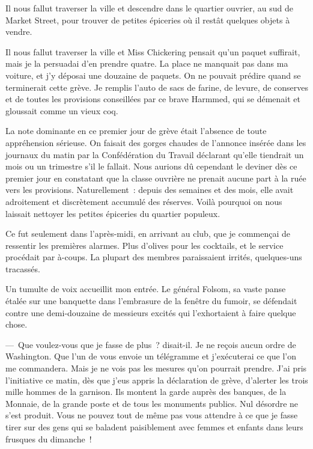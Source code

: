 \documentclass[french,twoside]{book} %
\begin{document}
Il nous fallut traverser la ville et descendre dans le quartier ouvrier, au sud de Market Street, pour trouver de petites épiceries où il restât quelques objets à vendre.\par
Il nous fallut traverser la ville et Miss Chickering pensait qu’un paquet suffirait, mais je la persuadai d’en prendre quatre. La place ne manquait pas dans ma voiture, et j’y déposai une douzaine de paquets. On ne pouvait prédire quand se terminerait cette grève. Je remplis l’auto de sacs de farine, de levure, de conserves et de toutes les provisions conseillées par ce brave Harmmed, qui se démenait et gloussait comme un vieux coq.\par
La note dominante en ce premier jour de grève était l’absence de toute appréhension sérieuse. On faisait des gorges chaudes de l’annonce insérée dans les journaux du matin par la Confédération du Travail déclarant qu’elle tiendrait un mois ou un trimestre s’il le fallait. Nous aurions dû cependant le deviner dès ce premier jour en constatant que la classe ouvrière ne prenait aucune part à la ruée vers les provisions. Naturellement : depuis des semaines et des mois, elle avait adroitement et discrètement accumulé des réserves. Voilà pourquoi on nous laissait nettoyer les petites épiceries du quartier populeux.\par
Ce fut seulement dans l’après-midi, en arrivant au club, que je commençai de ressentir les premières alarmes. Plus d’olives pour les cocktails, et le service procédait par à-coups. La plupart des membres paraissaient irrités, quelques-uns tracassés.\par
Un tumulte de voix accueillit mon entrée. Le général Folsom, sa vaste panse étalée sur une banquette dans l’embrasure de la fenêtre du fumoir, se défendait contre une demi-douzaine de messieurs excités qui l’exhortaient à faire quelque chose.\par
— Que voulez-vous que je fasse de plus ? disait-il. Je ne reçois aucun ordre de Washington. Que l’un de vous envoie un télégramme et j’exécuterai ce que l’on me commandera. Mais je ne vois pas les mesures qu’on pourrait prendre. J’ai pris l’initiative ce matin, dès que j’eus appris la déclaration de grève, d’alerter les trois mille hommes de la garnison. Ils montent la garde auprès des banques, de la Monnaie, de la grande poste et de tous les monuments publics. Nul désordre ne s’est produit. Vous ne pouvez tout de même pas vous attendre à ce que je fasse tirer sur des gens qui se baladent paisiblement avec femmes et enfants dans leurs frusques du dimanche !\par
\end{document}
